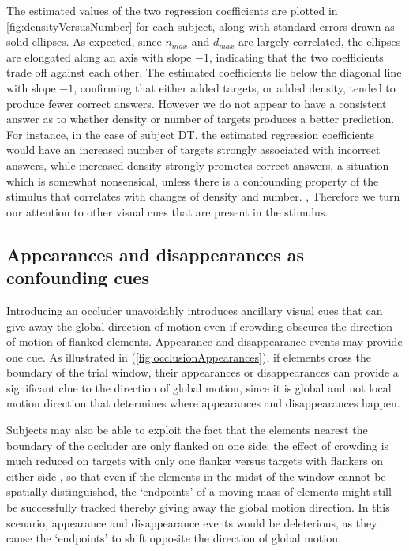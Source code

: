 \documentclass[../manuscript]{subfiles}
\begin{document}
The estimated values of the two regression coefficients are plotted in \autoref{fig:densityVersusNumber} for each subject, along with standard errors drawn as solid ellipses. As expected, since $n_{max}$ and $d_{max}$ are largely correlated, the ellipses are elongated along an axis with slope $-1$, indicating that the two coefficients trade off against each other. The estimated coefficients lie below the diagonal line with slope $-1$, confirming that either added targets, or added density, tended to produce fewer correct answers. However we do not appear to have a consistent answer as to whether density or number of targets produces a better prediction. For instance, in the case of subject DT, the estimated regression coefficients would have an increased number of targets strongly associated with incorrect answers, while increased density strongly promotes correct answers, a situation which is somewhat nonsensical, unless there is a confounding property of the stimulus that correlates with changes of density and number. , Therefore we turn our attention to other visual cues that are present in the stimulus.

\subsection{Appearances and disappearances as confounding cues}

Introducing an occluder unavoidably introduces ancillary visual cues that can give away the global direction of motion even if crowding obscures the direction of motion of flanked elements.  Appearance and disappearance events may provide one cue. As illustrated in (\autoref{fig:occlusionAppearances}), if elements cross the boundary of the trial window, their appearances or disappearances can provide a significant clue to the direction of global motion, since it is global and not local motion direction that determines where appearances and disappearances happen.

Subjects may also be able to exploit the fact that the elements nearest the boundary of the occluder are only flanked on one side; the effect of crowding is much reduced on targets with only one flanker versus targets with flankers on either side \citep{Bouma:1970ng}, so that even if the elements in the midst of the window cannot be spatially distinguished, the `endpoints' of a moving mass of elements might still be successfully tracked thereby giving away the global motion direction. In this scenario, appearance and disappearance events would be deleterious, as they cause the `endpoints' to shift opposite the direction of global motion.
\end{document}
